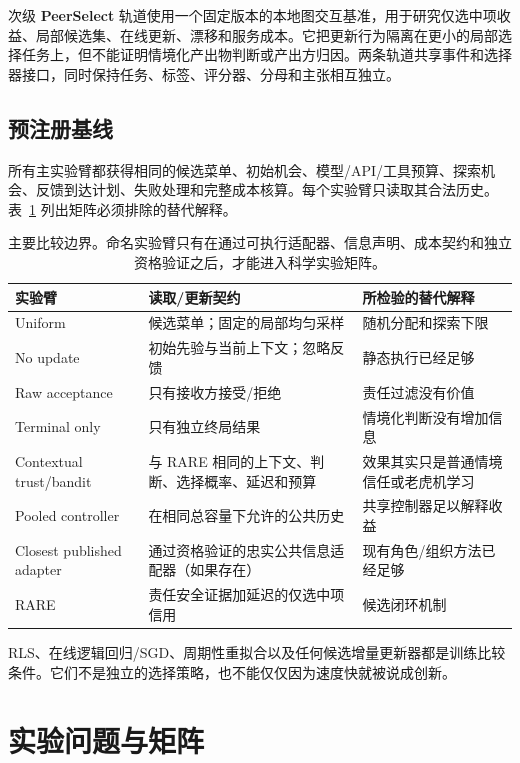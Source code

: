 \documentclass[UTF8,twocolumn]{ctexart}
\begin{document}
次级 \textbf{PeerSelect} 轨道使用一个固定版本的本地图交互基准，用于研究仅选中项收益、局部候选集、在线更新、漂移和服务成本。它把更新行为隔离在更小的局部选择任务上，但不能证明情境化产出物判断或产出方归因。两条轨道共享事件和选择器接口，同时保持任务、标签、评分器、分母和主张相互独立。

\subsection{预注册基线}
所有主实验臂都获得相同的候选菜单、初始机会、模型/API/工具预算、探索机会、反馈到达计划、失败处理和完整成本核算。每个实验臂只读取其合法历史。表~\ref{tab:baselines} 列出矩阵必须排除的替代解释。
\begin{table}[t]
\centering\small
\begin{tabular}{p{}p{}p{}}
\toprule
实验臂 & 读取/更新契约 & 所检验的替代解释 \\
\midrule
Uniform & 候选菜单；固定的局部均匀采样 & 随机分配和探索下限 \\
No update & 初始先验与当前上下文；忽略反馈 & 静态执行已经足够 \\
Raw acceptance & 只有接收方接受/拒绝 & 责任过滤没有价值 \\
Terminal only & 只有独立终局结果 & 情境化判断没有增加信息 \\
Contextual trust/bandit & 与 RARE 相同的上下文、判断、选择概率、延迟和预算 & 效果其实只是普通情境信任或老虎机学习 \\
Pooled controller & 在相同总容量下允许的公共历史 & 共享控制器足以解释收益 \\
Closest published adapter & 通过资格验证的忠实公共信息适配器（如果存在） & 现有角色/组织方法已经足够 \\
RARE & 责任安全证据加延迟的仅选中项信用 & 候选闭环机制 \\
\bottomrule
\end{tabular}
\caption{主要比较边界。命名实验臂只有在通过可执行适配器、信息声明、成本契约和独立资格验证之后，才能进入科学实验矩阵。}
\label{tab:baselines}
\end{table}

RLS、在线逻辑回归/SGD、周期性重拟合以及任何候选增量更新器都是训练比较条件。它们不是独立的选择策略，也不能仅仅因为速度快就被说成创新。

\section{实验问题与矩阵}
\label{sec:experiments}
\end{document}
